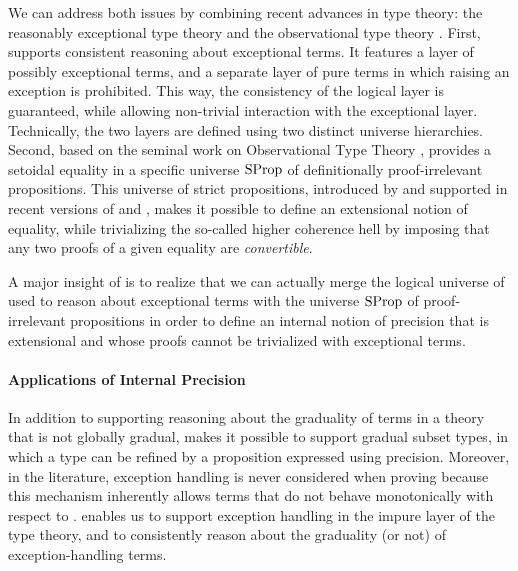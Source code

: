 \AP We can address both issues by combining recent advances in type theory:
the reasonably exceptional type theory  
and the observational type theory  .
First,  supports consistent reasoning about exceptional terms.
It features a layer of possibly exceptional terms,
and a separate layer of pure terms in which raising an exception is prohibited.
This way, the consistency of the logical layer is guaranteed,
while allowing non-trivial interaction with the exceptional layer.
Technically, the two layers are defined using two distinct universe hierarchies.
%
Second, based on the seminal work on Observational Type Theory , 
 provides a setoidal equality in a specific universe $\operatorname{SProp}$
of definitionally proof-irrelevant propositions. 
This universe of strict propositions, introduced by 
and supported in recent versions of  and , 
makes it possible to define an extensional notion of equality,
while trivializing the so-called higher coherence hell by imposing that any two proofs
of a given equality are \emph{convertible}.

A major insight of  is to realize that we can actually merge
the logical universe of  used to reason about exceptional terms
with the universe $\operatorname{SProp}$ of proof-irrelevant propositions in order to 
define an internal notion of precision that is extensional and whose proofs
cannot be trivialized with exceptional terms.

\paragraph{Applications of Internal Precision}

In addition to supporting reasoning about the graduality of terms in a theory
that is not globally gradual,  makes it possible
to support gradual subset types, in which a type can be refined
by a proposition expressed using precision.
Moreover, in the literature, exception handling is never considered
when proving  because this mechanism inherently allows terms that
do not behave monotonically with respect to .
 enables us to support exception handling in the impure layer
of the type theory,
and to consistently reason about the graduality (or not) of exception-handling terms.